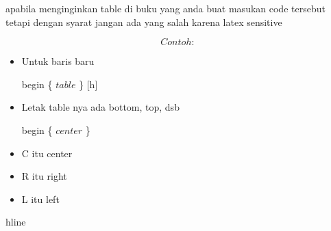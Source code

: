 \vspace{\baselineskip}
apabila menginginkan table di buku yang anda buat masukan code tersebut tetapi dengan syarat jangan ada yang salah karena latex sensitive
 
\begin{equation}
Contoh :
\end{equation}

\vspace{\baselineskip}

\begin{itemize}
	\item Untuk baris baru\par

\vspace{\baselineskip}
begin \{ $table$ \} [h]\par

	\item Letak table nya ada bottom, top, dsb\par

\vspace{\baselineskip}
begin \{ $center$ \} \par

\vspace{\baselineskip}
	\item C itu center\par
\vspace{\baselineskip}
	\item R itu right\par
\vspace{\baselineskip}
	\item L itu left
\end{itemize}\par

\vspace{\baselineskip}
\vspace{\baselineskip}
\noindent hline\par

